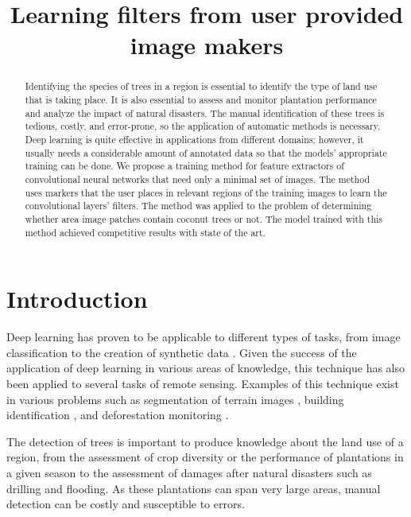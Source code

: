 \documentclass[a4paper,conference]{IEEEtran}
\begin{document}
\title{Learning filters from user provided image makers}

\maketitle

\begin{abstract}
  Identifying the species of trees in a region is essential to identify the type of land use that is taking place. It is also essential to assess and monitor plantation performance and analyze the impact of natural disasters. The manual identification of these trees is tedious, costly, and error-prone, so the application of automatic methods is necessary. Deep learning is quite effective in applications from different domains; however, it usually needs a considerable amount of annotated data so that the models' appropriate training can be done. We propose a training method for feature extractors of convolutional neural networks that need only a minimal set of images. The method uses markers that the user places in relevant regions of the training images to learn the convolutional layers' filters. The method was applied to the problem of determining whether area image patches contain coconut trees or not. The model trained with this method achieved competitive results with state of the art.
\end{abstract}

\section{Introduction}
Deep learning has proven to be applicable to different types of tasks, from image classification to the creation of synthetic data \cite{goodfellow2016deep}. Given the success of the application of deep learning in various areas of knowledge, this technique has also been applied to several tasks of remote sensing. Examples of this technique exist in various problems such as segmentation of terrain images \cite{kemker2018algorithms, kampffmeyer2016semantic, hamaguchi2018effective}, building identification \cite{xu2018building, lu2018detecting, liu2018multilevel}, and deforestation monitoring \cite{bragilevsky2017deep}. 

The detection of trees is important to produce knowledge about the land use of a region, from the assessment of crop diversity or the performance of plantations in a given season to the assessment of damages after natural disasters such as drilling and flooding. As these plantations can span very large areas, manual detection can be costly and susceptible to errors. 
\end{document}
